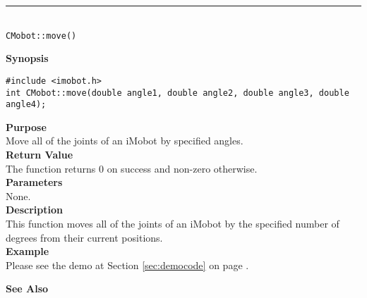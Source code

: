 \noindent
\vspace{5pt}
\rule{4.5in}{0.015in}\\
\noindent
{\LARGE \texttt{CMobot::move()}}\\
{}

\noindent
{\bf Synopsis}\\
\begin{verbatim}
#include <imobot.h>
int CMobot::move(double angle1, double angle2, double angle3, double angle4);
\end{verbatim}

\noindent
{\bf Purpose}\\
Move all of the joints of an iMobot by specified angles.\\

\noindent
{\bf Return Value}\\
The function returns 0 on success and non-zero otherwise.\\

\noindent
{\bf Parameters}\\
None.\\

\noindent
{\bf Description}\\
This function moves all of the joints of an iMobot by the specified number of degrees
from their current positions. \\

\noindent
{\bf Example}\\
Please see the demo at Section \ref{sec:democode} on page \pageref{sec:democode}.\\
\noindent

\noindent
{\bf See Also}\\

